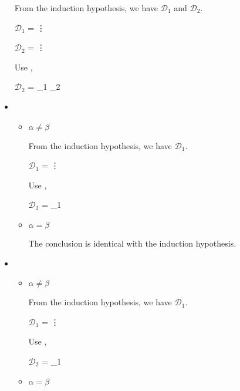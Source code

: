 \begin{itemize}
	      From the induction hypothesis, we have $\mathcal{D}_1$ and $\mathcal{D}_2$.

	      $\mathcal{D}_1$ = 
	      {\vdots}

	      $\mathcal{D}_2$ = 
	      {\vdots}

	      Use \KConv,

	      $\mathcal{D}_2$ = 
	      {_1 \andalso {}_2}

	\item \KTW

	      \begin{itemize}

		      \item $\alpha \neq \beta$

		            From the induction hypothesis, we have $\mathcal{D}_1$.

		            $\mathcal{D}_1$ = 
		            {\vdots}

		            Use \KTW,

		            $\mathcal{D}_2$ = 
		            {_1}

		      \item $\alpha = \beta$

		            The conclusion is identical with the induction hypothesis.

	      \end{itemize}

	\item \KTWL

	      \begin{itemize}

		      \item $\alpha \neq \beta$

		            From the induction hypothesis, we have $\mathcal{D}_1$.

		            $\mathcal{D}_1$ = 
		            {\vdots}

		            Use \KTWL,

		            $\mathcal{D}_2$ = 
		            {_1}

		      \item $\alpha = \beta$


\end{itemize}
\end{itemize}
